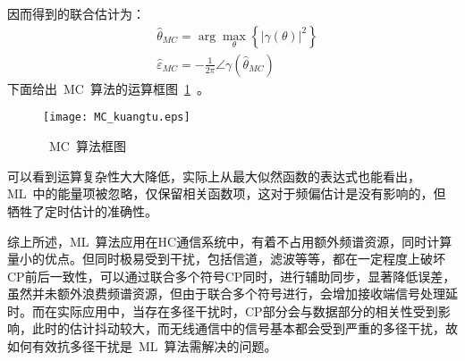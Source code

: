 因而得到的联合估计为：
\begin{align}
&{{\hat \theta }_{MC}} = \arg \mathop {\max }\limits_\theta  \left\{ {{{\left| {\gamma \left( \theta  \right)} \right|}^2}} \right\} \\
&{{\hat \varepsilon }_{MC}} =  - \frac{1}{{2\pi }}\angle \gamma \left( {{{\hat \theta }_{MC}}} \right)
\end{align}
下面给出~MC~算法的运算框图~\ref{MC_kuangtu}~。
\begin{figure}[htbp]
\centering
\texttt{[image: MC\_kuangtu.eps]}
\caption{~MC~算法框图}\vspace{-1em}\label{MC_kuangtu}
\end{figure}

可以看到运算复杂性大大降低，实际上从最大似然函数的表达式也能看出，ML~中的能量项被忽略，仅保留相关函数项，这对于频偏估计是没有影响的，但牺牲了定时估计的准确性。

综上所述，ML~算法应用在HC通信系统中，有着不占用额外频谱资源，同时计算量小的优点。但同时极易受到干扰，包括信道，滤波等等，都在一定程度上破坏CP前后一致性，可以通过联合多个符号CP同时，进行辅助同步，显著降低误差，虽然并未额外浪费频谱资源，但由于联合多个符号进行，会增加接收端信号处理延时。而在实际应用中，当存在多径干扰时，CP部分会与数据部分的相关性受到影响，此时的估计抖动较大，而无线通信中的信号基本都会受到严重的多径干扰，故如何有效抗多径干扰是~ML~算法需解决的问题。





